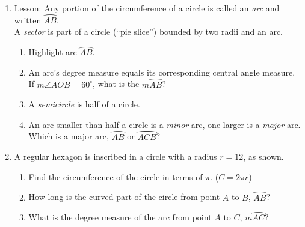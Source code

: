 \documentclass[12pt, twoside]{article}
\begin{document}
\begin{enumerate}
\newpage
\item Lesson: Any portion of the circumference of a circle is called an \emph{arc} and written $\wideparen{AB}$. \\[0.25cm]
A \emph{sector} is part of a circle (``pie slice'') bounded by two radii and an arc.
    \begin{multicols}{2}
    \raggedcolumns
    \begin{enumerate}[itemsep=0.5cm]
      \item Highlight arc $\wideparen{AB}$.
      \item An arc's degree measure equals its corresponding central angle measure. \\[0.25cm]
      If $m\angle AOB = 60^\circ$, what is the $m \wideparen{AB}$?
      \item A \emph{semicircle} is half of a circle.
      \item An arc smaller than half a circle is a \emph{minor} arc, one larger is a \emph{major} arc. \\[0.25cm]
      Which is a major arc, $\wideparen{AB}$ or $\wideparen{ACB}$?
    \end{enumerate}
    \end{multicols}

\newpage
\item A regular hexagon is inscribed in a circle with a radius $r=12$, as shown.
    \begin{multicols}{2}
    \raggedcolumns
    \begin{enumerate}[itemsep=2cm]
      \item Find the circumference of the circle in terms of $\pi$. ($C=2\pi r$)
      \item How long is the curved part of the circle from point $A$ to $B$, $\wideparen{AB}$?
      \item What is the degree measure of the arc from point $A$ to $C$,  $m \wideparen{AC}$?
    \end{enumerate}
    \end{multicols}


\end{enumerate}
\end{document}
